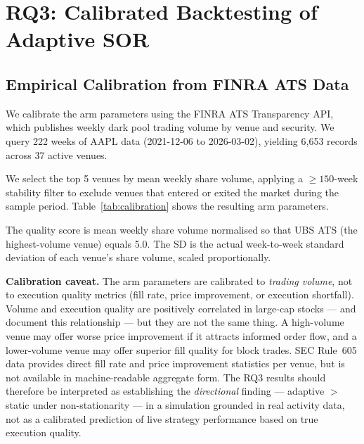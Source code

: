 \documentclass[11pt]{article}
\begin{document}
\section{RQ3: Calibrated Backtesting of Adaptive SOR}
\label{sec:rq3}

\subsection{Empirical Calibration from FINRA ATS Data}

We calibrate the arm parameters using the FINRA ATS Transparency API,
which publishes weekly dark pool trading volume by venue and security.
We query 222 weeks of AAPL data (2021-12-06 to 2026-03-02), yielding
6{,}653 records across 37 active venues.

We select the top 5 venues by mean weekly share volume, applying a
$\geq 150$-week stability filter to exclude venues that entered or exited
the market during the sample period.
Table~\ref{tab:calibration} shows the resulting arm parameters.

The quality score is mean weekly share volume normalised so that UBS ATS
(the highest-volume venue) equals 5.0.
The SD is the actual week-to-week standard deviation of each venue's share
volume, scaled proportionally.

\textbf{Calibration caveat.}
The arm parameters are calibrated to \emph{trading volume}, not to
execution quality metrics (fill rate, price improvement, or execution
shortfall).
Volume and execution quality are positively correlated in large-cap stocks
--- \citet{foley2016dark} and \citet{buti2017} document this relationship
--- but they are not the same thing.
A high-volume venue may offer worse price improvement if it attracts
informed order flow, and a lower-volume venue may offer superior fill
quality for block trades.
SEC Rule~605 data provides direct fill rate and price improvement
statistics per venue, but is not available in machine-readable aggregate
form.
The RQ3 results should therefore be interpreted as establishing the
\emph{directional} finding --- adaptive $>$ static under non-stationarity
--- in a simulation grounded in real activity data, not as a
calibrated prediction of live strategy performance based on true
execution quality.
\end{document}
